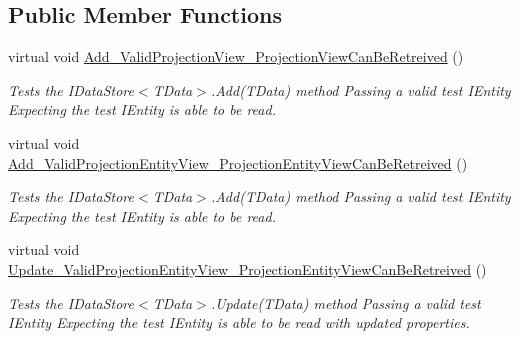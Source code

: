 \subsection*{Public Member Functions}
\begin{DoxyCompactItemize}
\item 
virtual void \hyperlink{classCqrs_1_1Azure_1_1BlobStorage_1_1Test_1_1Integration_1_1TableStorageDataStoreTests_a4d5cbb9f8690e2eff9529966e6816b5c_a4d5cbb9f8690e2eff9529966e6816b5c}{Add\+\_\+\+Valid\+Projection\+View\+\_\+\+Projection\+View\+Can\+Be\+Retreived} ()
\begin{DoxyCompactList}\small\item\em Tests the I\+Data\+Store$<$\+T\+Data$>$.\+Add(\+T\+Data) method Passing a valid test I\+Entity Expecting the test I\+Entity is able to be read. \end{DoxyCompactList}\item 
virtual void \hyperlink{classCqrs_1_1Azure_1_1BlobStorage_1_1Test_1_1Integration_1_1TableStorageDataStoreTests_acd703f5ee0699216338b5cd5e41d771a_acd703f5ee0699216338b5cd5e41d771a}{Add\+\_\+\+Valid\+Projection\+Entity\+View\+\_\+\+Projection\+Entity\+View\+Can\+Be\+Retreived} ()
\begin{DoxyCompactList}\small\item\em Tests the I\+Data\+Store$<$\+T\+Data$>$.\+Add(\+T\+Data) method Passing a valid test I\+Entity Expecting the test I\+Entity is able to be read. \end{DoxyCompactList}\item 
virtual void \hyperlink{classCqrs_1_1Azure_1_1BlobStorage_1_1Test_1_1Integration_1_1TableStorageDataStoreTests_ae2ea908fde732d4466091b01597918c6_ae2ea908fde732d4466091b01597918c6}{Update\+\_\+\+Valid\+Projection\+Entity\+View\+\_\+\+Projection\+Entity\+View\+Can\+Be\+Retreived} ()
\begin{DoxyCompactList}\small\item\em Tests the I\+Data\+Store$<$\+T\+Data$>$.\+Update(\+T\+Data) method Passing a valid test I\+Entity Expecting the test I\+Entity is able to be read with updated properties. \end{DoxyCompactList}\end{DoxyCompactItemize}
